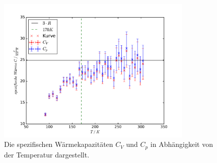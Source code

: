 \begin{figure}
  \centering
  \includegraphics[height = 7cm]{plots/Cplot.pdf}
  \caption{Die spezifischen Wärmekapazitäten \texorpdfstring{$C_V$}{math} und \texorpdfstring{$C_p$}{math} in Abhängigkeit von der Temperatur dargestellt.}
  \label{fig:CVP}
\end{figure}


